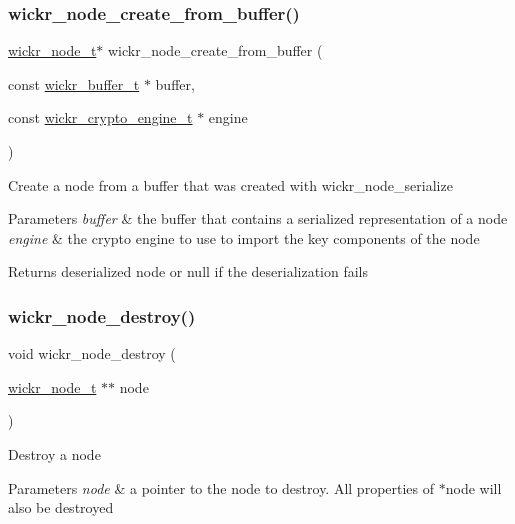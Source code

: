 \subsubsection{\texorpdfstring{wickr\+\_\+node\+\_\+create\+\_\+from\+\_\+buffer()}{wickr\_node\_create\_from\_buffer()}}
{\footnotesize\ttfamily \hyperlink{structwickr__node}{wickr\+\_\+node\+\_\+t}$\ast$ wickr\+\_\+node\+\_\+create\+\_\+from\+\_\+buffer (\begin{DoxyParamCaption}\item[{const \hyperlink{structwickr__buffer}{wickr\+\_\+buffer\+\_\+t} $\ast$}]{buffer,  }\item[{const \hyperlink{structwickr__crypto__engine}{wickr\+\_\+crypto\+\_\+engine\+\_\+t} $\ast$}]{engine }\end{DoxyParamCaption})}

Create a node from a buffer that was created with \textquotesingle{}wickr\+\_\+node\+\_\+serialize\textquotesingle{}


\begin{DoxyParams}{Parameters}
{\em buffer} & the buffer that contains a serialized representation of a node \\
\hline
{\em engine} & the crypto engine to use to import the key components of the node \\
\hline
\end{DoxyParams}
\begin{DoxyReturn}{Returns}
deserialized node or null if the deserialization fails 
\end{DoxyReturn}
\mbox{\label{group__wickr__node_ga6acf07885403d9df6baad36a8d797f73}} 
\subsubsection{\texorpdfstring{wickr\+\_\+node\+\_\+destroy()}{wickr\_node\_destroy()}}
{\footnotesize\ttfamily void wickr\+\_\+node\+\_\+destroy (\begin{DoxyParamCaption}\item[{\hyperlink{structwickr__node}{wickr\+\_\+node\+\_\+t} $\ast$$\ast$}]{node }\end{DoxyParamCaption})}

Destroy a node


\begin{DoxyParams}{Parameters}
{\em node} & a pointer to the node to destroy. All properties of \textquotesingle{}$\ast$node\textquotesingle{} will also be destroyed \\
\hline
\end{DoxyParams}
\mbox{\label{group__wickr__node_ga2ed650b947df7316cf0f915805ac5aa4}} 
